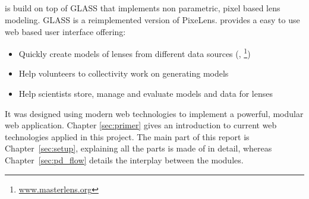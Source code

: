 
\subsection{\spl}

\spl is build on top of GLASS\cite{glass-jc} that implements non parametric, pixel based lens modeling.
GLASS is a reimplemented version of PixeLens\cite{pixelens}.
%
\spl provides a easy to use web based user interface offering:
\begin{itemize}
  \item Quickly create models of lenses from different data sources (\sw, \ml \footnote{\protect\url{www.masterlens.org}})
  \item Help volunteers to collectivity work on generating models
  \item Help scientists store, manage and evaluate models and data for lenses
\end{itemize}

It was designed using modern web technologies to implement a powerful, modular web application.
Chapter \ref{sec:primer} gives an introduction to current web technologies applied in this project.
The main part of this report is Chapter~\ref{sec:setup}, explaining all the parts \spl is made of in detail, whereas Chapter~\ref{sec:pd_flow} details the interplay between the modules.


